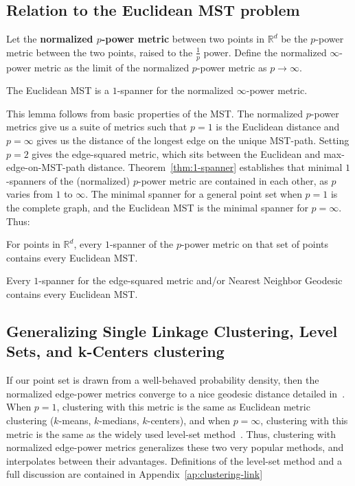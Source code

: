 \subsection{Relation to the Euclidean MST problem}
  \begin{definition}
  Let the \textbf{normalized $p$-power metric} between two points in
  $\mathbb{R}^d$ be the $p$-power metric between the two points,
  raised to the $\frac{1}{p}$ power. Define the normalized $\infty$-power
  metric as the limit of the normalized $p$-power metric as $p \rightarrow \infty$.
  \end{definition}
  \begin{lemma} The Euclidean MST is a
  $1$-spanner for the normalized $\infty$-power metric.
  \end{lemma}
  This lemma follows from basic properties of the MST.
  The normalized $p$-power metrics give us a suite of
  metrics such that $p=1$ is the Euclidean
  distance and $p=\infty$ gives us the distance of the longest edge on the
  unique MST-path.  Setting $p=2$ gives the edge-squared metric, which
  sits between the Euclidean and max-edge-on-MST-path distance. 
  Theorem~\ref{thm:1-spanner} establishes
  that minimal $1$-spanners of the (normalized) $p$-power
  metric are contained in each other, as $p$ varies from
  $1$ to $\infty$. The minimal spanner for a general point set when $p=1$ is the complete graph, and
 the Euclidean MST is the minimal spanner for $p=\infty$. Thus:
  \begin{theorem} 
    For points in $\mathbb{R}^d$, every $1$-spanner of the $p$-power
    metric on that set of points contains every Euclidean MST.
  \end{theorem}
  \begin{corollary}
    Every $1$-spanner for the edge-squared metric and/or Nearest
    Neighbor Geodesic contains every Euclidean
    MST. 
  \end{corollary}
  \subsection{Generalizing Single Linkage Clustering, Level Sets, and k-Centers
  clustering}
  If our point set is drawn from a well-behaved probability
  density, then the normalized edge-power metrics
  converge to a nice geodesic distance detailed
  in~\cite{hwang2016}. When $p=1$, clustering with this metric is
  the same as Euclidean metric clustering ($k$-means,
  $k$-medians, $k$-centers), and when $p=\infty$, clustering with
  this metric is the same as the widely used level-set
  method~\cite{Wishart69, Gower1969, Ester1996,OPTICS96}. Thus, clustering
  with normalized edge-power metrics generalizes these two very
  popular methods, and interpolates between their advantages.
  Definitions of
  the level-set method and a full discussion are contained in
  Appendix~\ref{ap:clustering-link}

